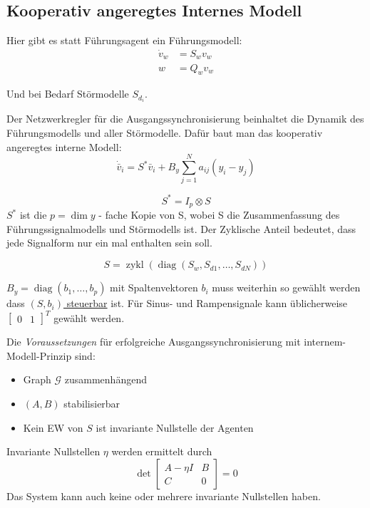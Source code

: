 \subsection{Kooperativ angeregtes Internes Modell}
\label{sec:leaderless_ausgang_internes_modell}
Hier gibt es statt Führungsagent ein Führungsmodell:
\begin{align}
    \dot{v}_w &= S_w v_w \\
    w &= Q_w v_w
\end{align}

Und bei Bedarf Störmodelle $S_{d_i}$.

Der Netzwerkregler für die Ausgangssynchronisierung beinhaltet die
Dynamik des Führungsmodells und aller Störmodelle.
Dafür baut man das kooperativ angeregtes interne Modell:
\begin{equation}
    \dot{\bar{v}}_i = S^*\bar{v}_i + B_y \sum_{j=1}^N a_{ij} (y_i-y_j)
\end{equation}

\begin{equation}
    S^* = I_p \otimes S
\end{equation}
$S^*$ ist die $p=\dim y$ - fache Kopie von S, wobei S die Zusammenfassung des
Führungssignalmodells und Störmodells ist. Der Zyklische Anteil bedeutet, dass jede
Signalform nur ein mal enthalten sein soll.

\begin{equation}
    S = \operatorname{zykl}(\operatorname{diag} (S_w, S_{d1}, \dots, S_{dN}))
\end{equation}

\underline{$B_y = \operatorname{diag}(b_1,\dots,b_p)$} mit Spaltenvektoren $b_i$
muss weiterhin so gewählt werden dass \underline{$(S, b_i)$ steuerbar} ist.
Für Sinus- und Rampensignale kann üblicherweise $\begin{bmatrix}
    0 & 1
\end{bmatrix}^T$ gewählt werden.

Die \emph{Voraussetzungen} für erfolgreiche Ausgangssynchronisierung
mit internem-Modell-Prinzip sind:

\begin{itemize}
    \item Graph $\mathcal{G}$ zusammenhängend
    \item $(A,B)$ stabilisierbar
    \item Kein EW von $S$ ist invariante Nullstelle der Agenten
\end{itemize}

Invariante Nullstellen $\eta$ werden ermittelt durch
\begin{equation}
    \det \begin{bmatrix}
        A-\eta I & B \\
        C & 0
    \end{bmatrix} = 0
\end{equation}
Das System kann auch keine oder mehrere invariante Nullstellen haben.

